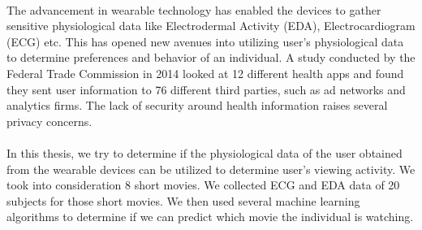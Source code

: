 \paragraph{}
The advancement in wearable technology has enabled the devices to gather sensitive physiological data like Electrodermal Activity (EDA), Electrocardiogram (ECG) etc. This has opened new avenues into utilizing user’s physiological data to determine preferences and behavior of an individual. A study conducted by the Federal Trade Commission in 2014 looked at 12 different health apps and found they sent user information to 76 different third parties, such as ad networks and analytics firms. \cite{FTCStudy} The lack of security around health information raises several privacy concerns.
\paragraph{}
In this thesis, we try to determine if the physiological data of the user obtained from the wearable devices can be utilized to determine user’s viewing activity. We took into consideration 8 short movies. We collected ECG and EDA data of 20 subjects for those short movies. We then used several machine learning algorithms to determine if we can predict which movie the individual is watching.